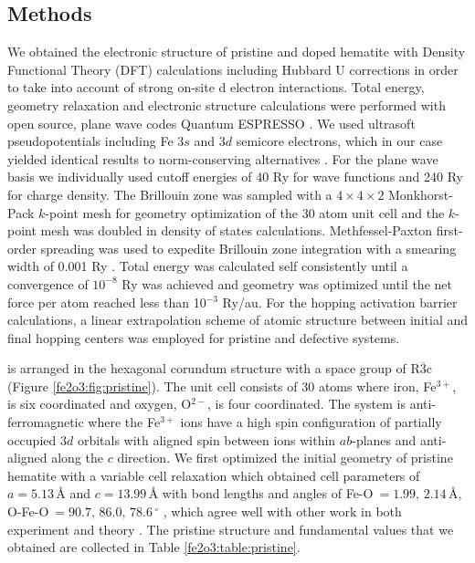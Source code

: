 \subsection{Methods}
We obtained the electronic structure of pristine and doped hematite with Density Functional Theory (DFT) calculations including Hubbard U corrections in order to take into account of strong on-site d electron interactions. Total energy, geometry relaxation and electronic structure calculations were performed with open source, plane wave codes Quantum ESPRESSO \cite{QE1}. We used ultrasoft pseudopotentials \cite{gbrv} including Fe $3s$ and $3d$ semicore electrons, which in our case yielded identical results to norm-conserving alternatives \cite{ONCV1,ONCV2}. For the plane wave basis we individually used cutoff energies of 40 Ry for wave functions and 240 Ry for charge density. The Brillouin zone was sampled with a $4\times4\times2$ Monkhorst-Pack $k$-point mesh for geometry optimization of the 30 atom unit cell and the $k$-point mesh was doubled in density of states calculations. Methfessel-Paxton first-order spreading was used to expedite Brillouin zone integration with a smearing width of 0.001 Ry \cite{methfessel1989high}. Total energy was calculated self consistently until a convergence of $10^{-8}$ Ry was achieved and geometry was optimized until the net force per atom reached less than 10$^{-3}$ Ry/au. For the hopping activation barrier calculations, a linear extrapolation scheme of atomic structure between initial and final hopping centers was employed for pristine and defective systems.

 is arranged in the hexagonal corundum structure with a space group of R$\overline{3}$c \cite{pauling1925crystal} (Figure \ref{fe2o3:fig:pristine}). The unit cell consists of 30 atoms where iron, Fe$^{3+}$, is six coordinated and oxygen, O$^{2-}$, is four coordinated. The system is anti-ferromagnetic where the Fe$^{3+}$ ions have a high spin configuration of partially occupied $3d$ orbitals with aligned spin between ions within $ab$-planes and anti-aligned along the $c$ direction. We first optimized the initial geometry of pristine hematite with a variable cell relaxation which obtained cell parameters of $a=5.13\,${\AA} and $c=13.99\,${\AA} with bond lengths and angles of Fe-O$\ = 1.99,\, 2.14\,${\AA}, O-Fe-O$\ = 90.7,\,86.0,\,78.6\, ^\circ$ , which agree well with other work in both experiment \cite{finger1980crystal} and theory \cite{adelstein2014density}. The pristine structure and fundamental values that we obtained are collected in Table \ref{fe2o3:table:pristine}.\\

